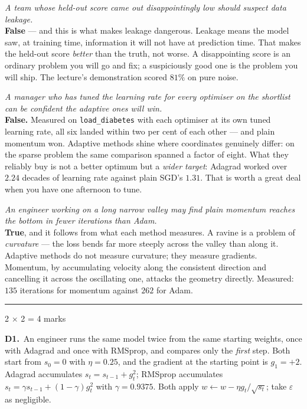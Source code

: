 \documentclass[10pt,a4paper]{article}
\newcommand{\parthead}[2]{\vspace{2pt}\noindent\rule{\linewidth}{0.4pt}\par\vspace{2pt}%
  \noindent{\bfseries Part #1}\hfill{\small #2}\par\vspace{1pt}}
\begin{document}
\begin{sC}

  \item \emph{A team whose held-out score came out disappointingly low should suspect data leakage.}\\[2pt] \textbf{False} --- and this is what makes leakage dangerous. Leakage means the model saw, at training time, information it will not have at prediction time. That makes the held-out score \emph{better} than the truth, not worse. A disappointing score is an ordinary problem you will go and fix; a suspiciously good one is the problem you will ship. The lecture's demonstration scored $81\%$ on pure noise.

  \item \emph{A manager who has tuned the learning rate for every optimiser on the shortlist can be confident the adaptive ones will win.}\\[2pt] \textbf{False.} Measured on \texttt{load\_diabetes} with each optimiser at its own tuned learning rate, all six landed within two per cent of each other --- and plain momentum won. Adaptive methods shine where coordinates genuinely differ: on the sparse problem the same comparison spanned a factor of eight. What they reliably buy is not a better optimum but a \emph{wider target}: Adagrad worked over $2.24$ decades of learning rate against plain SGD's $1.31$. That is worth a great deal when you have one afternoon to tune.

  \item \emph{An engineer working on a long narrow valley may find plain momentum reaches the bottom in fewer iterations than Adam.}\\[2pt] \textbf{True}, and it follows from what each method measures. A ravine is a problem of \emph{curvature} --- the loss bends far more steeply across the valley than along it. Adaptive methods do not measure curvature; they measure gradients. Momentum, by accumulating velocity along the consistent direction and cancelling it across the oscillating one, attacks the geometry directly. Measured: $135$ iterations for momentum against $262$ for Adam.

\end{sC}

\newpage

\parthead{D --- Short answer}{2 $\times$ 2 = 4 marks}

\textbf{D1.}\ An engineer runs the same model twice from the same starting weights, once with Adagrad and once with RMSprop, and compares only the \emph{first} step. Both start from $s_0 = 0$ with $\eta = 0.25$, and the gradient at the starting point is $g_1 = +2$. Adagrad accumulates $s_t = s_{t-1} + g_t^2$; RMSprop accumulates $s_t = \gamma s_{t-1} + (1-\gamma)g_t^2$ with $\gamma = 0.9375$. Both apply $w \leftarrow w - \eta g_t/\sqrt{s_t}$; take $\varepsilon$ as negligible.
\end{document}

